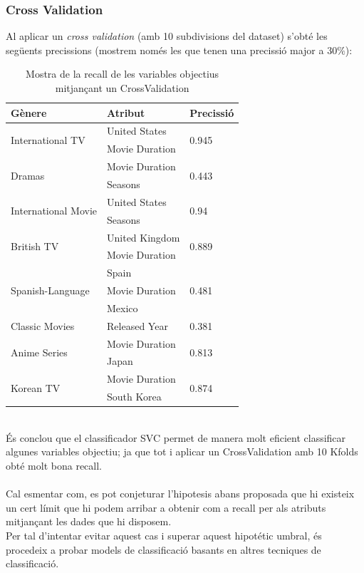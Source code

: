 \documentclass[a4paper, 11pt]{article}
\begin{document}
\subsubsection{Cross Validation}
Al aplicar un \textit{cross validation} (amb 10 subdivisions del dataset) s'obté les següents precissions (mostrem només les que tenen una precissió major a $30\%$):
\begin{table}[h]
    \centering
    \begin{tabular}{l|l|l}
        \textbf{Gènere} & \textbf{Atribut} & \textbf{Precissió}\\\hline\hline
            \multirow{2}{*}{International TV} &  United States & \multirow{2}{*}{0.945} \\
            & Movie Duration& \\ \hline
        \multirow{2}{*}{Dramas} &  Movie Duration & \multirow{2}{*}{0.443} \\ 
        & Seasons & \\\hline
        \multirow{2}{*}{International Movie} &  United States & \multirow{2}{*}{0.94} \\
            & Seasons & \\ \hline
        \multirow{2}{*}{British TV} &  United Kingdom & \multirow{2}{*}{0.889} \\
            & Movie Duration &  \\ \hline
        \multirow{3}{*}{Spanish-Language} &  Spain & \multirow{3}{*}{0.481} \\
            & Movie Duration & \\
            & Mexico & \\ \hline
        Classic Movies & Released Year & 0.381 \\ \hline
        \multirow{2}{*}{Anime Series} & Movie Duration & \multirow{2}{*}{0.813}\\
        & Japan & \\ \hline
        \multirow{2}{*}{Korean TV} & Movie Duration & \multirow{2}{*}{0.874}\\
        & South Korea & \\ 
        
    \end{tabular}
    \caption{Mostra de la recall de les variables objectius mitjançant un CrossValidation}
    \label{tab:my_label}
\end{table}\\
És conclou que el classificador SVC permet de manera molt eficient classificar algunes variables objectiu; ja que tot i aplicar un CrossValidation amb 10 Kfolds obté molt bona recall.\\\\
Cal esmentar com, es pot conjeturar l'hipotesis abans proposada que hi existeix un cert límit que hi podem arribar a obtenir com a recall per als atributs mitjançant les dades que hi disposem. \\
Per tal d'intentar evitar aquest cas i superar aquest hipotétic umbral, és procedeix a probar models de classificació basants en altres tecniques de classificació.
\end{document}
